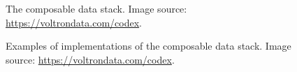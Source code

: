 \documentclass[
  authoryear]{elsarticle}
\begin{document}
\begin{figure}


\caption{\label{fig-composable-data-stack}The composable data stack.
Image source: \url{https://voltrondata.com/codex}.}

\end{figure}%

\begin{figure}


\caption{\label{fig-cds-examples}Examples of implementations of the
composable data stack. Image source:
\url{https://voltrondata.com/codex}.}

\end{figure}%
\end{document}
